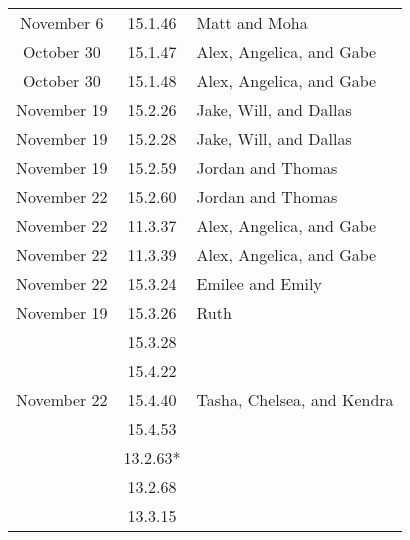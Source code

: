 \documentclass[12pt]{amsart}
\begin{document}
\begin{longtable}{c|c|l}
        November 6      & 15.1.46                              & Matt and Moha                            \\
        October 30      & 15.1.47                              & Alex, Angelica, and Gabe                 \\
        October 30      & 15.1.48                              & Alex, Angelica, and Gabe                 \\
        November 19     & 15.2.26                              & Jake, Will, and Dallas                   \\
        November 19     & 15.2.28                              & Jake, Will, and Dallas                   \\
        November 19     & 15.2.59                              & Jordan and Thomas                        \\
        November 22     & 15.2.60                              & Jordan and Thomas                        \\
        November 22     & 11.3.37                              & Alex, Angelica, and Gabe                 \\
        November 22     & 11.3.39                              & Alex, Angelica, and Gabe                 \\
        November 22     & 15.3.24                              & Emilee and Emily                         \\
        November 19     & 15.3.26                              & Ruth                                     \\
                        & 15.3.28                              &                                          \\
                        & 15.4.22                              &                                          \\
        November 22     & 15.4.40                              & Tasha, Chelsea, and Kendra               \\
                        & 15.4.53                              &                                          \\
                        & 13.2.63*                             &                                          \\
                        & 13.2.68                              &                                          \\
                        & 13.3.15                              &                                          \\

\end{longtable}
\end{document}
